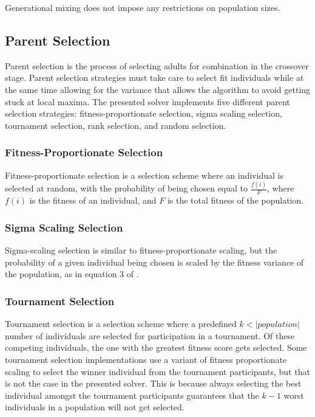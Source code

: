\documentclass[twocolumn,oneside]{amsart}
\begin{document}
Generational mixing does not impose any restrictions on population sizes.

\subsection{Parent Selection}
Parent selection is the process of selecting adults for combination in the crossover stage.
Parent selection strategies must take care to select fit individuals while at the same time allowing for the variance that allows the algorithm to avoid getting stuck at local maxima.
The presented solver implements five different parent selection strategies: fitness-proportionate selection, sigma scaling selection, tournament selection, rank selection, and random selection.

\subsubsection{Fitness-Proportionate Selection}
Fitness-proportionate selection is a selection scheme where an individual is selected at random, with the probability of being chosen equal to $ \frac{f(i)}{F} $, where $ f(i) $ is the fitness of an individual, and $ F $ is the total fitness of the population.

\subsubsection{Sigma Scaling Selection}
Sigma-scaling selection is similar to fitness-proportionate scaling, but the probability of a given individual being chosen is scaled by the fitness variance of the population, as in equation 3 of \cite{ea-appendices}.

\subsubsection{Tournament Selection}

Tournament selection is a selection scheme where a predefined $ k < | population | $ number of individuals are selected for participation in a tournament.
Of these competing individuals, the one with the greatest fitness score gets selected.
Some tournament selection implementations use a variant of fitness proportionate scaling to select the winner individual from the tournament participants, but that is not the case in the presented solver.
This is because always selecting the best individual amongst the tournament participants guarantees that the $ k - 1 $ worst individuals in a population will not get selected.
\end{document}
